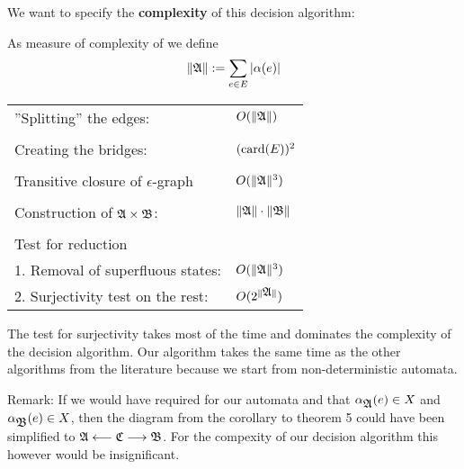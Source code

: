 We want to specify the {\bf complexity} of this decision algorithm:

As measure of complexity of  we define 
\[ \|\mbox{$\mathfrak{A}$}\| := \sum_{e \in E} |\alpha(e)| \]

\begin{tabular}{ll}
  ''Splitting'' the edges: & $O(\|\mbox{$\mathfrak{A}$}\|)$ \\  \\
  Creating the bridges: & $(\mathrm{card}({E}))^2$ \\ \\
  Transitive closure of $\epsilon$-graph & $O(\|\mbox{$\mathfrak{A}$}\|^3)$ \\  \\
  Construction of $\mbox{$\mathfrak{A}$} \times \mbox{$\mathfrak{B}$}$: & $\|\mbox{$\mathfrak{A}$}\| \cdot \|\mbox{$\mathfrak{B}$}\|$ \\ \\
  Test for reduction \\
  1. Removal of superfluous states: & $O(\|\mbox{$\mathfrak{A}$}\|^3)$ \\
  2. Surjectivity test on the rest: & $O(2^{\|\mbox{$\mathfrak{A}$}\|})$
\end{tabular}

The test for surjectivity takes most of the time and dominates the complexity of
the decision algorithm. Our algorithm takes the same time as the other
algorithms from the literature \cite{AHU} because we start from
non-deterministic automata.

\medskip
Remark: If we would have required for our automata  and  that
$\alpha_{\mbox{$\mathfrak{A}$}}(e) \in X$ and $\alpha_{\mbox{$\mathfrak{B}$}}(e) \in X$, then the diagram from
the corollary to theorem 5 could have been simplified to $\mbox{$\mathfrak{A}$} \longleftarrow 
\mbox{$\mathfrak{C}$} \longrightarrow \mbox{$\mathfrak{B}$}$. For the compexity of our decision algorithm
this however would be insignificant.

